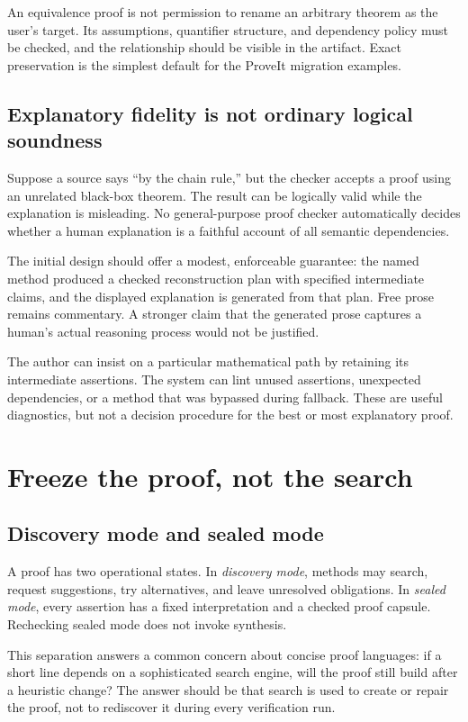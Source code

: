 \documentclass[11pt,a4paper]{article}
\theoremstyle{remark}
\begin{document}
An equivalence proof is not permission to rename an arbitrary theorem as the user's target. Its assumptions, quantifier structure, and dependency policy must be checked, and the relationship should be visible in the artifact. Exact preservation is the simplest default for the ProveIt migration examples.

\subsection{Explanatory fidelity is not ordinary logical soundness}
Suppose a source says ``by the chain rule,'' but the checker accepts a proof using an unrelated black-box theorem. The result can be logically valid while the explanation is misleading. No general-purpose proof checker automatically decides whether a human explanation is a faithful account of all semantic dependencies.

The initial design should offer a modest, enforceable guarantee: the named method produced a checked reconstruction plan with specified intermediate claims, and the displayed explanation is generated from that plan. Free prose remains commentary. A stronger claim that the generated prose captures a human's actual reasoning process would not be justified.

The author can insist on a particular mathematical path by retaining its intermediate assertions. The system can lint unused assertions, unexpected dependencies, or a method that was bypassed during fallback. These are useful diagnostics, but not a decision procedure for the best or most explanatory proof.

\section{Freeze the proof, not the search}\label{sec:freeze}

\subsection{Discovery mode and sealed mode}
A proof has two operational states. In \emph{discovery mode}, methods may search, request suggestions, try alternatives, and leave unresolved obligations. In \emph{sealed mode}, every assertion has a fixed interpretation and a checked proof capsule. Rechecking sealed mode does not invoke synthesis.

This separation answers a common concern about concise proof languages: if a short line depends on a sophisticated search engine, will the proof still build after a heuristic change? The answer should be that search is used to create or repair the proof, not to rediscover it during every verification run.
\end{document}
